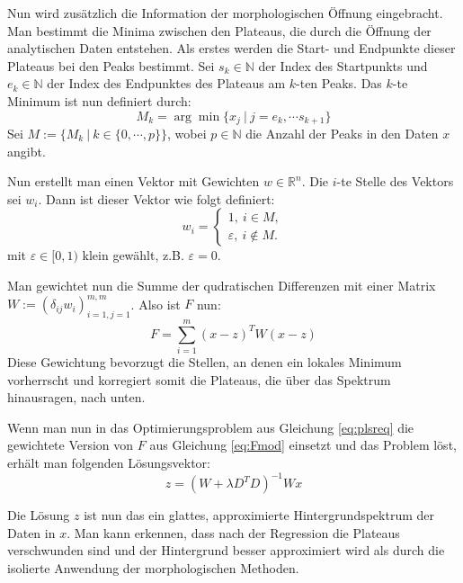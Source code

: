\documentclass{article}
\newcommand{\R}[0]{\mathbb{R}}
\newcommand{\N}[0]{\mathbb{N}}
\theoremstyle{plain}
\theoremstyle{definition}
\begin{document}
Nun wird zusätzlich die Information der morphologischen Öffnung eingebracht.
Man bestimmt die Minima zwischen den Plateaus, die durch die Öffnung der analytischen Daten entstehen. 
Als erstes werden die Start- und Endpunkte dieser Plateaus bei den Peaks bestimmt.
Sei $s_k \in \N$ der Index des Startpunkts und $e_k \in \N$ der Index des Endpunktes des Plateaus am $k$-ten Peaks. Das $k$-te Minimum ist nun definiert durch:
\begin{equation}
    M_k = \arg\min \{x_j \: | \: j=e_k,\cdots s_{k+1}\}
\end{equation}
Sei $M := \{M_k \: | \: k \in \{0, \cdots, p\}\}$, wobei $p \in \mathbb{N}$ die Anzahl der Peaks in den Daten $x$ angibt.

Nun erstellt man einen Vektor mit Gewichten $w \in \R^n$. Die $i$-te Stelle des Vektors sei $w_i$. Dann ist dieser Vektor wie folgt definiert:
\begin{equation}
    w_i = \begin{cases}
        1, \: i \in M, \\
        \varepsilon, \: i \notin M.
    \end{cases}
\end{equation} 
mit $\varepsilon \in [0, 1)$ klein gewählt, z.B. $\varepsilon = 0$.

Man gewichtet nun die Summe der qudratischen Differenzen mit einer Matrix $W := (\delta_{ij} w_i)_{i=1, j=1}^{m,m}$. Also ist $F$ nun:
\begin{equation}\label{eq:Fmod}
    F = \sum\limits_{i=1}^m (x-z)^TW(x-z)
\end{equation}
Diese Gewichtung bevorzugt die Stellen, an denen ein lokales Minimum vorherrscht und korregiert somit die Plateaus, die über das Spektrum hinausragen, nach unten.

Wenn man nun in das Optimierungsproblem aus Gleichung \ref{eq:plsreq} die gewichtete Version von $F$ aus Gleichung \ref{eq:Fmod} einsetzt und das Problem löst, erhält man folgenden Lösungsvektor:
\begin{equation}
    z = (W + \lambda D^TD)^{-1}Wx
\end{equation}

Die Lösung $z$ ist nun das ein glattes, approximierte Hintergrundspektrum der Daten in $x$.
Man kann erkennen, dass nach der Regression die Plateaus verschwunden sind und der Hintergrund besser approximiert wird als durch die isolierte Anwendung der morphologischen Methoden. 

\clearpage

\end{document}
